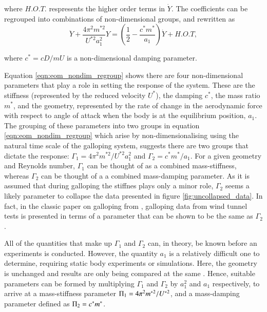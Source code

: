 where $H.O.T.$ respresents the higher order terms in $\dot{Y}$. The coefficients can be regrouped into combinations of non-dimensional groups, and rewritten as
\begin{equation}
  \label{eqn:eom_nondim_regroup}
  \ddot{Y} + \frac{4\pi^{2}m^{*2}}{U^{*2}a_1^2}Y = \left(\frac{1}{2} - \frac{c^*m^*}{a_1}\right)\dot{Y} + H.O.T,
\end{equation}

where $c^*=cD/mU$ is a non-dimensional damping parameter.

Equation \ref{eqn:eom_nondim_regroup} shows there are four non-dimensional parameters that play a role in setting the response of the system. These are the stiffness (represented by the reduced velocity $U^*$), the damping $c^*$, the mass ratio $m^*$, and the geometry, represented by the rate of change in the aerodynamic force with respect to angle of attack when the body is at the equilibrium position, $a_1$. The grouping of these parameters into two groups in equation \ref{eqn:eom_nondim_regroup} which arise by non-dimensionalising using the natural time scale of the galloping system, suggests there are two groups that dictate the response: $\Gamma_1 = 4\pi^2m^{*2}/U^{*2}a_1^2$ and $\Gamma_2 = c^*m^*/a_1$. For a given geometry and Reynolds number, $\Gamma_1$ can be thought of as a combined mass-stiffness, whereas $\Gamma_2$ can be thought of a a combined mass-damping parameter. As it is assumed that during galloping the stiffnes plays only a minor role, $\Gamma_2$ seems a likely parameter to collapse the data presented in figure \ref{fig:uncollapsed_data}. In fact, in the classic paper on galloping from \citet{Parkinson1964}, galloping data from wind tunnel tests is presented in terms of a parameter that can be shown to be the same as $\Gamma_2$.

All of the quantities that make up $\Gamma_1$ and $\Gamma_2$ can, in theory, be known before an experiments is conducted. However, the quantity $a_1$ is a relatively difficult one to determine, requiring static body experiments or simulations. Here, the geometry is unchanged and results are only being compared at the same \reynoldsnumber. Hence, suitable parameters can be formed by multiplying $\Gamma_1$ and $\Gamma_2$ by $a_1^2$ and $a_1$ respectively, to arrive at a mass-stiffness parameter $\Pi_1 =  4\pi^2m^{*2}/U^{*2}$, and a mass-damping parameter defined as $\Pi_2 = c^*m^*$.

